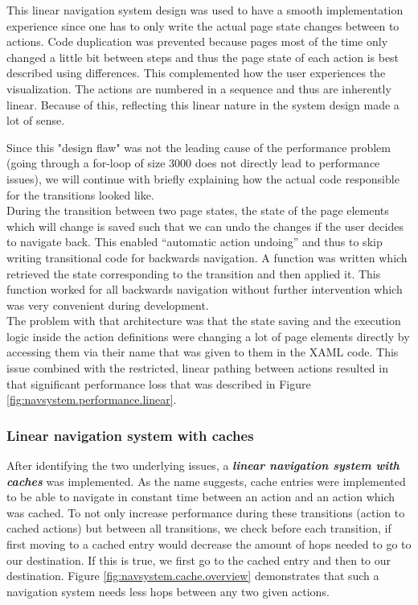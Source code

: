 This linear navigation system design was used to have a smooth implementation experience since one has to only write the actual page state changes between to actions. Code duplication was prevented because pages most of the time only changed a little bit between steps and thus the page state of each action is best described using differences. This complemented how the user experiences the visualization. The actions are numbered in a sequence and thus are inherently linear. Because of this, reflecting this linear nature in the system design made a lot of sense.

Since this "design flaw" was not the leading cause of the performance problem (going through a for-loop of size 3000 does not directly lead to performance issues), we will continue with briefly explaining how the actual code responsible for the transitions looked like.\\
During the transition between two page states, the state of the page elements which will change is saved such that we can undo the changes if the user decides to navigate back. This enabled ``automatic action undoing'' and thus to skip writing transitional code for backwards navigation. A function was written which retrieved the state corresponding to the transition and then applied it. This function worked for all backwards navigation without further intervention which was very convenient during development. \\
The problem with that architecture was that the state saving and the execution logic inside the action definitions were changing a lot of page elements directly by accessing them via their name that was given to them in the XAML code. This issue combined with the restricted, linear pathing between actions resulted in that significant performance loss that was described in Figure \ref{fig:navsystem.performance.linear}.

\subsubsection{Linear navigation system with caches}

After identifying the two underlying issues, a \textbf{\textit{linear navigation system with caches}} was implemented. As the name suggests, cache entries were implemented to be able to navigate in constant time between an action and an action which was cached. To not only increase performance during these transitions (action to cached actions) but between all transitions, we check before each transition, if first moving to a cached entry would decrease the amount of hops needed to go to our destination. If this is true, we first go to the cached entry and then to our destination. Figure \ref{fig:navsystem.cache.overview} demonstrates that such a  navigation system needs less hops between any two given actions.

